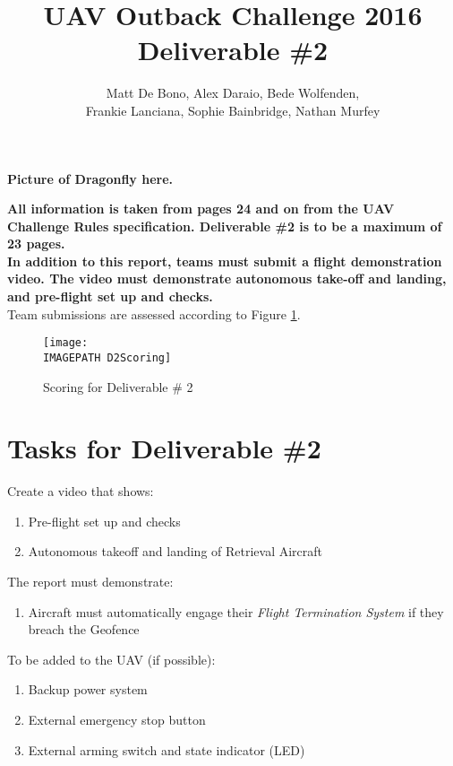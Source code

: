 \documentclass{article}
\title{UAV Outback Challenge 2016\\ \large Deliverable \#2\\}
\author{
	Matt De Bono,
	Alex Daraio,
	Bede Wolfenden,\\
	Frankie Lanciana,
	Sophie Bainbridge,
	Nathan Murfey}
\newcommand{\IMAGEPATH}{../Images/}
\begin{document}
\maketitle

\textbf{Picture of Dragonfly here.}

\newpage

\tableofcontents

\newpage

\textbf{All information is taken from pages 24 and on from the UAV Challenge Rules specification. Deliverable \#2 is to be a maximum of 23 pages.}\\

\textbf{In addition to this report, teams must submit a flight demonstration video. The video must demonstrate autonomous take-off and landing, and pre-flight set up and checks.}\\

Team submissions are assessed according to Figure \ref{fig:D2Scoring}.

\begin{figure}[h]
	\centering
	\texttt{[image: \\IMAGEPATH D2Scoring]}
	\caption{Scoring for Deliverable \# 2}
	\label{fig:D2Scoring}
\end{figure}

\section{Tasks for Deliverable \#2}
Create a video that shows:
\begin{enumerate}
	\item Pre-flight set up and checks
	\item Autonomous takeoff and landing of Retrieval Aircraft
\end{enumerate}

The report must demonstrate:
\begin{enumerate}
	\item Aircraft must automatically engage their \textit{Flight Termination System} if they breach the Geofence
\end{enumerate}

To be added to the UAV (if possible):
\begin{enumerate}
	\item Backup power system
	\item External emergency stop button
	\item External arming switch and state indicator (LED)
\end{enumerate}
\end{document}
